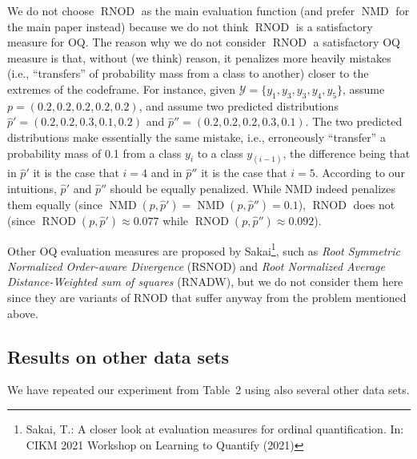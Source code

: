 \documentclass[10pt,a4paper]{article}
\DeclareMathOperator{\nmd}{NMD}
\DeclareMathOperator{\rnod}{RNOD}
\begin{document}
We do not choose $\rnod$ as the main evaluation function (and prefer
$\nmd$ for the main paper instead) because we do not think $\rnod$ is
a satisfactory measure for OQ. The reason why we do not consider
$\rnod$ a satisfactory OQ measure is that, without (we think) reason,
it penalizes more heavily mistakes (i.e., ``transfers'' of probability
mass from a class to another) closer to the extremes of the
codeframe. For instance, given
$\mathcal{Y}=\{y_{1},y_{3},y_{3}, y_{4},y_{5}\}$, assume
$p=(0.2,0.2,0.2,0.2,0.2)$, and assume two predicted distributions
$\hat{p}'=(0.2,0.2,0.3,0.1,0.2)$ and
$\hat{p}''=(0.2,0.2,0.2,0.3,0.1)$. The two predicted distributions
make essentially the same mistake, i.e., erroneously ``transfer'' a
probability mass of 0.1 from a class $y_{i}$ to a class $y_{(i-1)}$,
the difference being that in $\hat{p}'$ it is the case that $i=4$ and
in $\hat{p}''$ it is the case that $i=5$. According to our intuitions,
$\hat{p}'$ and $\hat{p}''$ should be equally penalized. While NMD
indeed penalizes them equally (since
$\nmd(p,\hat{p}')=\nmd(p,\hat{p}'')=0.1$), $\rnod$ does not (since
$\rnod(p,\hat{p}')\approx 0.077$ while
$\rnod(p,\hat{p}'')\approx
0.092$). %

Other OQ evaluation measures are proposed by Sakai\footnote{Sakai, T.:
A closer look at evaluation measures for ordinal quantification. In:
CIKM 2021 Workshop on Learning to Quantify (2021)}, such as
\emph{Root Symmetric Normalized Order-aware Divergence} (RSNOD) and
\emph{Root Normalized Average Distance-Weighted sum of squares}
(RNADW), but we do not consider them here since they are variants of
RNOD that suffer anyway from the problem mentioned above.


\subsection{Results on other data sets}

\noindent We have repeated our experiment from Table~2 using also
several other data sets.
\end{document}
